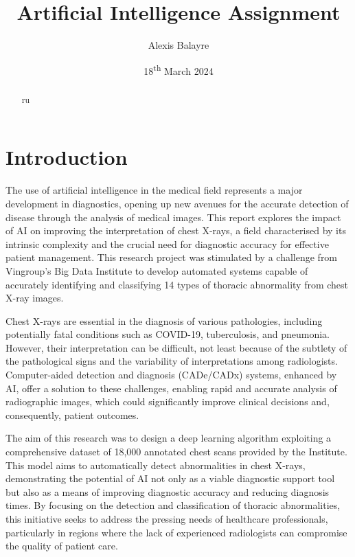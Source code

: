 \documentclass[12pt,oneside]{book} %
\title{Artificial Intelligence Assignment}
\author{Alexis Balayre}
\date{18\textsuperscript{th} March 2024}
\begin{document}
\frontmatter

\maketitle

\begin{abstract}

    ru

\end{abstract}

{
\clearpage
\singlespacing
{
    \tableofcontents
}
\clearpage

\listoffigures

\listoftables
}

\mainmatter
\pagestyle{fancy}
\fancyhead[L]{\nouppercase{\leftmark}}
\fancyhead[R]{\nouppercase{\rightmark}}

\chapter{Introduction}
The use of artificial intelligence in the medical field represents a major
development in diagnostics, opening up new avenues for the accurate detection
of disease through the analysis of medical images. This report explores the
impact of AI on improving the interpretation of chest X-rays, a field
characterised by its intrinsic complexity and the crucial need for diagnostic
accuracy for effective patient management. This research project was stimulated
by a challenge from Vingroup's Big Data Institute to develop automated systems
capable of accurately identifying and classifying 14 types of thoracic
abnormality from chest X-ray images.

Chest X-rays are essential in the diagnosis of various pathologies, including
potentially fatal conditions such as COVID-19, tuberculosis, and pneumonia.
However, their interpretation can be difficult, not least because of the
subtlety of the pathological signs and the variability of interpretations among
radiologists. Computer-aided detection and diagnosis (CADe/CADx) systems,
enhanced by AI, offer a solution to these challenges, enabling rapid and
accurate analysis of radiographic images, which could significantly improve
clinical decisions and, consequently, patient outcomes.

The aim of this research was to design a deep learning algorithm exploiting a
comprehensive dataset of 18,000 annotated chest scans provided by the
Institute. This model aims to automatically detect abnormalities in chest
X-rays, demonstrating the potential of AI not only as a viable diagnostic
support tool but also as a means of improving diagnostic accuracy and reducing
diagnosis times. By focusing on the detection and classification of thoracic
abnormalities, this initiative seeks to address the pressing needs of
healthcare professionals, particularly in regions where the lack of experienced
radiologists can compromise the quality of patient care.
\end{document}
